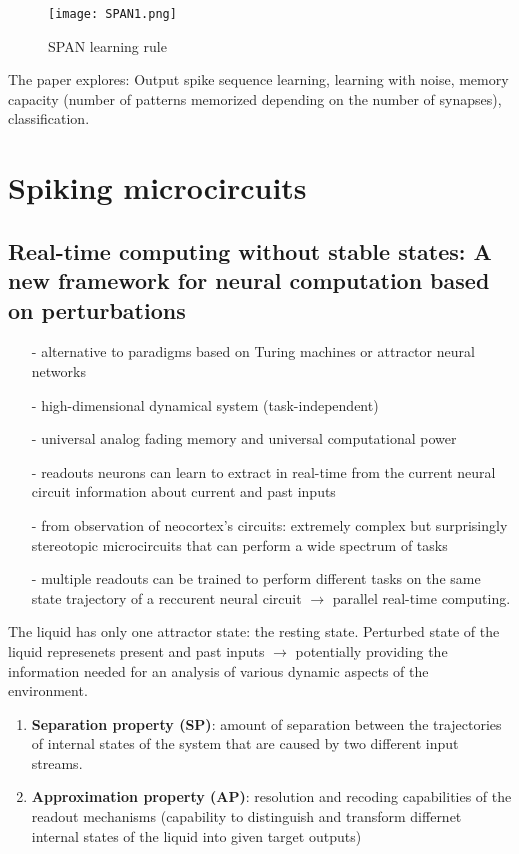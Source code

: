 \documentclass[12pt]{article}
\begin{document}
\begin{figure}
\center
\texttt{[image: SPAN1.png]}
\caption{SPAN learning rule}
\label{SPAN1}
\end{figure}

The paper explores: Output spike sequence learning, learning with noise, memory capacity (number of patterns memorized depending on the number of synapses), classification.

\section{Spiking microcircuits}
\subsection{Real-time computing without stable states: A new framework for neural computation based on perturbations \cite{maass2002real}}

\begin{itemize}
\item[-] alternative to paradigms based on Turing machines or attractor neural networks
\item[-] high-dimensional dynamical system (task-independent)
\item[-] universal analog fading memory and universal computational power
\item[-] readouts neurons can learn to extract in real-time from the current neural circuit information about current and past inputs
\item[-] from observation of neocortex's circuits: extremely complex but surprisingly stereotopic microcircuits that can perform a wide spectrum of tasks
\item[-] multiple readouts can be trained to perform different tasks on the same state trajectory of a reccurent neural circuit $\rightarrow$ parallel real-time computing.
\end{itemize}

The liquid has only one attractor state: the resting state. Perturbed state of the liquid represenets present and past inputs $\rightarrow$ potentially providing the information needed for an analysis of various dynamic aspects of the environment.

\begin{enumerate}
\item \textbf{Separation property (SP)}: amount of separation between the trajectories of internal states of the system that are caused by two different input streams.

\item \textbf{Approximation property (AP)}: resolution and recoding capabilities of the readout mechanisms (capability to distinguish and transform differnet internal states of the liquid into given target outputs)


\end{enumerate}
\end{document}
